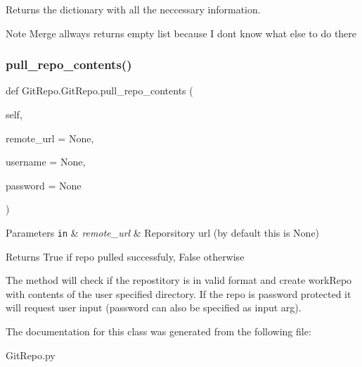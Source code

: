 Returns the dictionary with all the neccessary information. 

\begin{DoxyNote}{Note}
Merge allways returns empty list because I don\textquotesingle{}t know what else to do there 
\end{DoxyNote}
\mbox{\label{class_git_repo_1_1_git_repo_aca477c66170b04a8b16032f6fa95f056}} 
\subsubsection{\texorpdfstring{pull\+\_\+repo\+\_\+contents()}{pull\_repo\_contents()}}
{\footnotesize\ttfamily def Git\+Repo.\+Git\+Repo.\+pull\+\_\+repo\+\_\+contents (\begin{DoxyParamCaption}\item[{}]{self,  }\item[{}]{remote\+\_\+url = {\ttfamily None},  }\item[{}]{username = {\ttfamily None},  }\item[{}]{password = {\ttfamily None} }\end{DoxyParamCaption})}


\begin{DoxyParams}[1]{Parameters}
\mbox{\tt in}  & {\em remote\+\_\+url} & Reporsitory url (by default this is None) \\
\hline
\end{DoxyParams}
\begin{DoxyReturn}{Returns}
True if repo pulled successfuly, False otherwise
\end{DoxyReturn}
The method will check if the repostitory is in valid format and create work\+Repo with contents of the user specified directory. If the repo is password protected it will request user input (password can also be specified as input arg). 

The documentation for this class was generated from the following file\+:\begin{DoxyCompactItemize}
\item 
Git\+Repo.\+py\end{DoxyCompactItemize}
